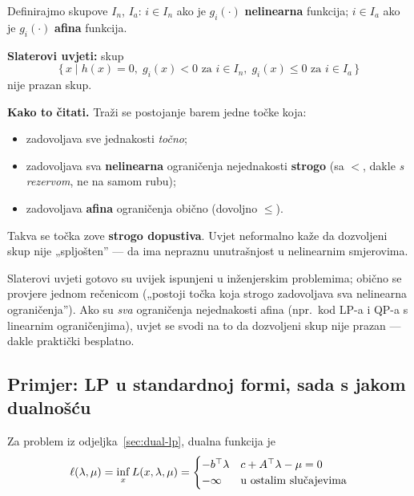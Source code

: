 \begin{definicija}
Definirajmo skupove $I_n$, $I_a$: $i \in I_n$ ako je $g_i(\cdot)$
\textbf{nelinearna} funkcija; $i \in I_a$ ako je $g_i(\cdot)$ \textbf{afina}
funkcija.

\textbf{Slaterovi uvjeti:} skup
\[
\{\, x \mid h(x) = 0,\; g_i(x) < 0 \text{ za } i \in I_n,\;
g_i(x) \le 0 \text{ za } i \in I_a \,\}
\]
nije prazan skup.
\end{definicija}

\textbf{Kako to čitati.} Traži se postojanje barem jedne točke koja:

\begin{itemize}
  \item zadovoljava sve jednakosti \emph{točno};
  \item zadovoljava sva \textbf{nelinearna} ograničenja nejednakosti
        \textbf{strogo} (sa $<$, dakle \emph{s rezervom}, ne na samom rubu);
  \item zadovoljava \textbf{afina} ograničenja obično (dovoljno $\le$).
\end{itemize}

Takva se točka zove \textbf{strogo dopustiva}. Uvjet neformalno kaže da
dozvoljeni skup nije „spljošten” --- da ima nepraznu unutrašnjost u nelinearnim
smjerovima.

\begin{napomena}
Slaterovi uvjeti gotovo su uvijek ispunjeni u inženjerskim problemima; obično se
provjere jednom rečenicom („postoji točka koja strogo zadovoljava sva
nelinearna ograničenja”). Ako su \emph{sva} ograničenja nejednakosti afina
(npr.\ kod LP-a i QP-a s linearnim ograničenjima), uvjet se svodi na to da
dozvoljeni skup nije prazan --- dakle praktički besplatno.
\end{napomena}

\subsection{Primjer: LP u standardnoj formi, sada s jakom dualnošću}

Za problem iz odjeljka~\ref{sec:dual-lp}, dualna funkcija je
\[
\ell(\lambda,\mu) = \inf_x L(x,\lambda,\mu) =
\begin{cases}
-b^{\top}\lambda & c + A^{\top}\lambda - \mu = 0 \\
-\infty & \text{u ostalim slučajevima}
\end{cases}
\]

